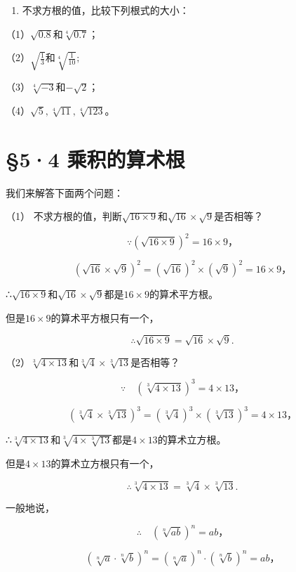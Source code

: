 \begin{enumerate}[start=2]
\item
  不求方根的值，比较下列根式的大小：
\end{enumerate}

（1）\(\sqrt{0.8}\)和\(\sqrt[4]{0.7}\)；

（2）\(\sqrt{\frac{1}{3}}\)和\(\sqrt[4]{\frac{1}{10}};\)

（3）\(\sqrt[4]{-3}\)和\(-\sqrt{2}\)；

（4）\(\sqrt{5}, \sqrt[4]{11}, \sqrt[4]{123}\)。

\section{§5·4 乘积的算术根}

我们来解答下面两个问题：

（1）
不求方根的值，判断\(\sqrt{16 \times 9}\)和\(\sqrt{16} \times \sqrt{9}\)是否相等？

\[
\because (\sqrt {16 \times 9}) ^ {2} = 16 \times 9\text{，}
\]

\[
(\sqrt {16} \times \sqrt {9}) ^ {2} = (\sqrt {16}) ^ {2} \times (\sqrt {9}) ^ {2} = 16 \times 9\text{，}
\]

∴\(\sqrt{16 \times 9}\)和\(\sqrt{16} \times \sqrt{9}\)都是\(16 \times 9\)的算术平方根。

但是\(16 \times 9\)的算术平方根只有一个，

\[
\therefore \sqrt {16 \times 9} = \sqrt {16} \times \sqrt {9}.
\]

（2）\(\sqrt[3]{4\times13}\)和\(\sqrt[3]{4}\times\sqrt[3]{13}\)是否相等？

\[
\because \quad (\sqrt[3]{4 \times 13}) ^ {3} = 4 \times 13\text{，}
\]

\[
(\sqrt[3]{4} \times \sqrt[3]{13}) ^ {3} = (\sqrt[3]{4}) ^ {3} \times (\sqrt[3]{13}) ^ {3} = 4 \times 13\text{，}
\]

∴\(\sqrt[3]{4\times13}\)和\(\sqrt[3]{4\times\sqrt[3]{13}}\)都是\(4\times13\)的算术立方根。

但是\(4 \times 13\)的算术立方根只有一个，

\[
\therefore \sqrt[3]{4 \times 13} = \sqrt[3]{4} \times \sqrt[3]{13}.
\]

一般地说，

\[
\therefore \quad (\sqrt[n]{a b}) ^ {n} = a b\text{，}
\]

\[
(\sqrt[n]{a} \cdot \sqrt[n]{b}) ^ {n} = (\sqrt[n]{a}) ^ {n} \cdot (\sqrt[n]{b}) ^ {n} = a b\text{，}
\]

